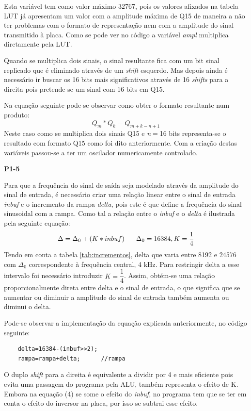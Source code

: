 \documentclass[11pt]{article}
\begin{document}
Esta variável tem como valor máximo $ 32767 $, pois os valores afixados na tabela LUT já apresentam um valor com a amplitude máxima de Q15 de maneira a não ter problemas com o formato de representação nem com a amplitude do sinal transmitido à placa.
Como se pode ver no código a variável \textit{ampl} multiplica diretamente pela LUT. 
\vspace{2 mm}

Quando se multiplica dois sinais, o sinal resultante fica com um bit sinal replicado que é eliminado através de um \textit{shift} esquerdo. Mas depois ainda é necessário ir buscar os 16 bits mais significativos através de 16 \textit{shifts} para a direita pois pretende-se um sinal com 16 bits em Q15. 

Na equação seguinte pode-se observar como obter o formato resultante num produto:
\begin{equation}
Q_{m} * Q_{k}=Q_{m+k-n+1}
\end{equation}
Neste caso como se multiplica dois sinais Q15 e \textit{n}$=$16 bits representa-se o resultado com formato Q15 como foi dito anteriormente.
Com a criação destas variáveis passou-se a ter um oscilador numericamente controlado.
\vspace{2 mm}

\textbf{P1-5}

Para que a frequência do sinal de saída seja modelado através da amplitude do sinal de entrada, é necessário criar uma relação linear entre o sinal de entrada \textit{inbuf} e o incremento da rampa \textit{delta}, pois este é que define a frequência do sinal sinusoidal com a rampa. Como tal a relação entre o \textit{inbuf} e o \textit{delta} é ilustrada pela seguinte equação:
\begin{equation}
	\Delta=\Delta_0+(K*inbuf)	\hspace{6 mm}\Delta_0=16384, K=\frac{1}{4}
\end{equation}
Tendo em conta a tabela \ref{tab:incrementos}, delta que varia entre 8192 e 24576 com $\Delta_0$ correspondente à frequência central, 4 kHz. Para restringir delta a esse intervalo foi necessário introduzir $K=\dfrac{1}{4}$. Assim, obtém-se uma relação proporcionalmente direta entre delta e o sinal de entrada, o que significa que se aumentar ou diminuir a amplitude do sinal de entrada também aumenta ou diminui o delta.

Pode-se observar a implementação da equação explicada anteriormente, no código seguinte:

\begin{lstlisting}
	delta=16384-(inbuf>>2); 
	rampa=rampa+delta;		//rampa
\end{lstlisting}
O duplo \textit{shift} para a direita é equivalente a dividir por 4 e mais eficiente pois evita uma passagem do programa pela ALU, também representa o efeito de K.
Embora na equação (4) se some o efeito do \textit{inbuf}, no programa tem que se ter em conta o efeito do inversor na placa, por isso se subtrai esse efeito.
\pagebreak
\end{document}
